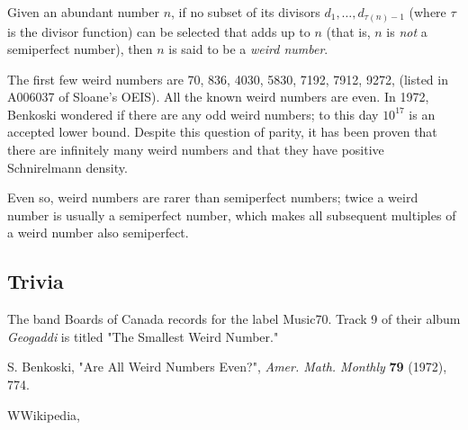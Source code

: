 \documentclass[12pt]{article}
\begin{document}
Given an abundant number $n$, if no subset of its divisors $d_1, \ldots , d_{\tau(n) - 1}$ (where $\tau$ is the divisor function) can be selected that adds up to $n$ (that is, $n$ is {\em not} a semiperfect number), then $n$ is said to be a {\em weird number}.

The first few weird numbers are 70, 836, 4030, 5830, 7192, 7912, 9272, (listed in A006037 of Sloane's OEIS). All the known weird numbers are even. In 1972, Benkoski wondered if there are any odd weird numbers; to this day $10^{17}$ is an accepted lower bound. Despite this question of parity, it has been proven that there are infinitely many weird numbers and that they have positive Schnirelmann density.

Even so, weird numbers are rarer than semiperfect numbers; twice a weird number is usually a semiperfect number, which makes all subsequent multiples of a weird number also semiperfect.

\subsection{Trivia}

The band Boards of Canada records for the label Music70. Track 9 of their album {\it Geogaddi} is titled "The Smallest Weird Number."

\begin{thebibliography}{9}
S. Benkoski, "Are All Weird Numbers Even?", {\it Amer. Math. Monthly} {\bf 79} (1972), 774.

\bibitem
WWikipedia, 
\end{thebibliography}
\end{document}
